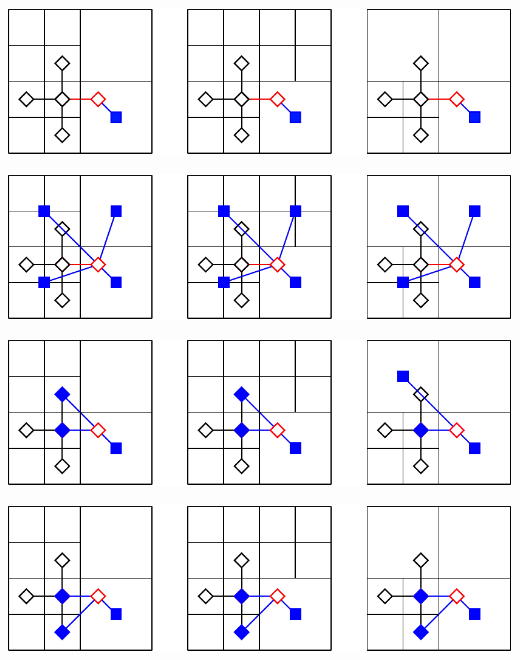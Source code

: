 \begin{DoxyImage}
\includegraphics[width=\textwidth,height=\textheight/2,keepaspectratio=true]{fc0}
\end{DoxyImage}

\begin{DoxyImage}
\includegraphics[width=\textwidth,height=\textheight/2,keepaspectratio=true]{fc1}
\end{DoxyImage}

\begin{DoxyImage}
\includegraphics[width=\textwidth,height=\textheight/2,keepaspectratio=true]{fcsimple}
\end{DoxyImage}

\begin{DoxyImage}
\includegraphics[width=\textwidth,height=\textheight/2,keepaspectratio=true]{fclinear}
\end{DoxyImage}

